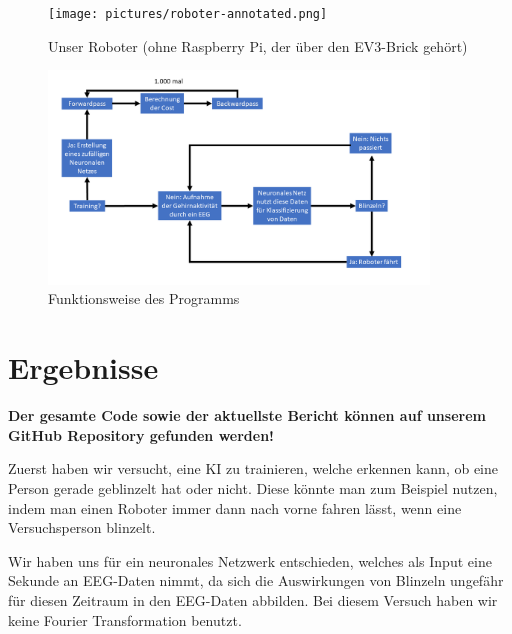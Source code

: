 \documentclass{scrartcl}
\begin{document}
	\begin{figure}[H]
		\centering
		\texttt{[image: pictures/roboter-annotated.png]}
		\caption{Unser Roboter (ohne Raspberry Pi, der über den EV3-Brick gehört)}
		\label{Robot}
	\end{figure}


	\begin{figure}[h!]
		\centering
		\includegraphics[width=0.9\textwidth]{pictures/Abbildung-des-Programms.png}
		\caption{Funktionsweise des Programms}
		\label{Gesamtfunktion}
	\end{figure}



	\section{Ergebnisse}

	{\large \textbf{Der gesamte Code sowie der aktuellste Bericht können auf unserem GitHub Repository gefunden werden! \cite{InterpretingEEG}} }

	Zuerst haben wir versucht, eine KI zu trainieren, welche erkennen kann, ob eine Person gerade geblinzelt hat oder nicht. Diese könnte man zum Beispiel nutzen, indem man einen Roboter immer dann nach vorne fahren lässt, wenn eine Versuchsperson blinzelt.

	Wir haben uns für ein neuronales Netzwerk entschieden, welches als Input eine Sekunde an EEG-Daten nimmt, da sich die Auswirkungen von Blinzeln ungefähr für diesen Zeitraum in den EEG-Daten abbilden. Bei diesem Versuch haben wir keine Fourier Transformation benutzt.
\end{document}
